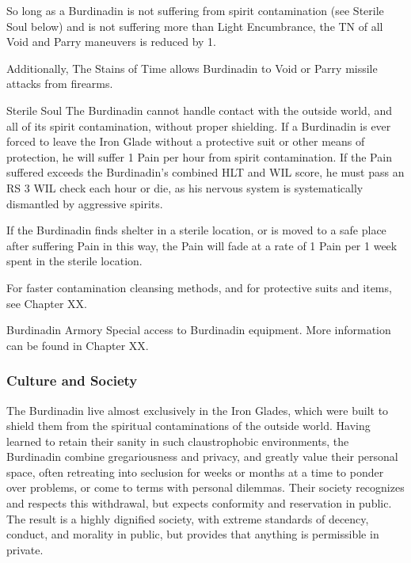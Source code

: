 \documentclass[oneside,11pt,english]{book}
\begin{document}
 

So long as a Burdinadin is not suffering from spirit contamination (see Sterile Soul below) and is 
not suffering more than Light Encumbrance, the TN of all Void and Parry maneuvers is reduced 
by 1. 

 

Additionally, The Stains of Time allows Burdinadin to Void or Parry missile attacks from 
firearms. 

 

Sterile Soul 
The Burdinadin cannot handle contact with the outside world, and all of its spirit contamination, 
without proper shielding. If a Burdinadin is ever forced to leave the Iron Glade without a 
protective suit or other means of protection, he will suffer 1 Pain per hour from spirit 
contamination. If the Pain suffered exceeds the Burdinadin's combined HLT and WIL score, he 
must pass an RS 3 WIL check each hour or die, as his nervous system is systematically 
dismantled by aggressive spirits. 

 

If the Burdinadin finds shelter in a sterile location, or is moved to a safe place after suffering Pain 
in this way, the Pain will fade at a rate of 1 Pain per 1 week spent in the sterile location. 

 

For faster contamination cleansing methods, and for protective suits and items, see Chapter XX. 

 

Burdinadin Armory 
Special access to Burdinadin equipment. More information can be found in Chapter XX. 

 

\subsubsection*{Culture and Society} 
The Burdinadin live almost exclusively in the Iron Glades, which were built to shield them from the 
spiritual contaminations of the outside world. Having learned to retain their sanity in such claustrophobic 
environments, the Burdinadin combine gregariousness and privacy, and greatly value their personal 
space, often retreating into seclusion for weeks or months at a time to ponder over problems, or come to 
terms with personal dilemmas. Their society recognizes and respects this withdrawal, but expects 
conformity and reservation in public. The result is a highly dignified society, with extreme standards of 
decency, conduct, and morality in public, but provides that anything is permissible in private. 
\end{document}
